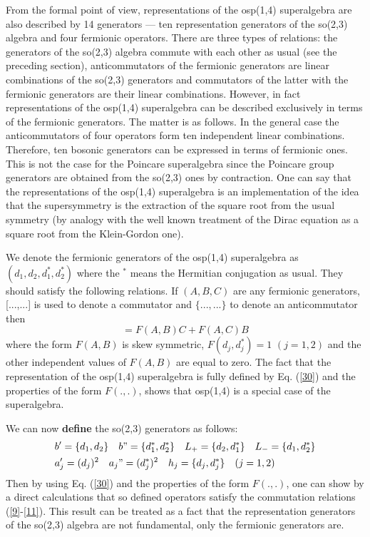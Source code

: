 \documentclass[a4paper,12pt]{article}%
\begin{document}
From the formal point of view, representations of the osp(1,4) 
superalgebra are also described by 14 generators --- ten 
representation generators of the so(2,3) algebra and four 
fermionic operators. There are three types of 
relations: the generators
of the so(2,3) algebra commute with each other as usual 
(see the preceding section), anticommutators of the 
fermionic generators are linear combinations of the so(2,3) 
generators and commutators of the latter with
the fermionic generators are their linear combinations. 
However, in fact representations of the osp(1,4) 
superalgebra can be described exclusively
in terms of the fermionic generators. The matter is 
as follows. In the general case the anticommutators of four 
operators form ten independent linear combinations. 
Therefore, ten bosonic generators can be expressed
in terms of fermionic ones. This is not the case for the 
Poincare superalgebra since the Poincare group generators 
are obtained from the so(2,3) ones by contraction. One can 
say that the representations of the
osp(1,4) superalgebra is an implementation of the idea that 
the supersymmetry
is the extraction of the square root from the usual 
symmetry (by
analogy with the well known treatment of the Dirac equation 
as a square
root from the Klein-Gordon one).

We denote the fermionic generators of the osp(1,4) superalgebra
as $(d_1,d_2,d_1^*,d_2^*)$ where the $^*$ means the 
Hermitian conjugation as 
usual. They should satisfy the following relations. 
If $(A,B,C)$ are any
fermionic generators, [...,...] is used to denote 
a commutator and
$\{...,...\}$ to denote an anticommutator then   
\begin{equation}
[A,\{ B,C\} ]=F(A,B)C + F(A,C)B
\label{30}
\end{equation}
where the form $F(A,B)$ is skew symmetric, $F(d_j,d_j^*)=1$ 
$(j=1,2)$ and
the other independent values of $F(A,B)$ are equal to zero.
The fact that the representation of the osp(1,4) superalgebra 
is fully defined by Eq. (\ref{30}) and the properties of the form
$F(.,.)$, shows that osp(1,4) is a special case of the
superalgebra.  

We can now {\bf define} the so(2,3) generators as follows:
\begin{eqnarray}
&b'=\{d_1,d_2\}\quad b"=\{d_1^*,d_2^*\}\quad
L_+=\{d_2,d_1^*\}\quad L_-=\{d_1,d_2^*\}\nonumber\\
&a_j'=(d_j)^2\quad a_j"=(d_j^*)^2\quad 
h_j=\{d_j,d_j^*\} \quad (j=1,2)
\label{31}
\end{eqnarray}
Then by using Eq. (\ref{30}) and the properties of the form
$F(.,.)$, one can show by a direct calculations that so 
defined operators satisfy the commutation relations
(\ref{9}-\ref{11}). This result can be treated as a fact
that the representation generators of the so(2,3) algebra
are not fundamental, only the fermionic generators are.
\end{document}
